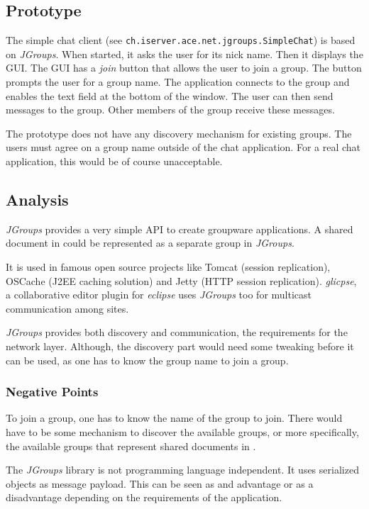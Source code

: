 \subsection{Prototype}
The simple chat client (see \texttt{ch.iserver.ace.net.jgroups.SimpleChat}) is based on \emph{JGroups}. When started, it asks the user for its nick name. Then it displays the GUI. The GUI has a \emph{join} button that allows the user to join a group. The button prompts the user for a group name. The application connects to the group and enables the text field at the bottom of the window. The user can then send messages to the group. Other members of the group receive these messages.

The prototype does not have any discovery mechanism for existing groups. The users must agree on a group name outside of the chat application. For a real chat application, this would be of course unacceptable.


\subsection{Analysis}
\emph{JGroups} provides a very simple API to create groupware applications. A shared document in \ace could be represented as a separate group in \emph{JGroups}. 

It is used in famous open source projects like Tomcat (session replication), OSCache (J2EE caching solution) and Jetty (HTTP session replication). \emph{glicpse}, a collaborative editor plugin for \emph{eclipse} uses \emph{JGroups} too for multicast communication among sites.

\emph{JGroups} provides both discovery and communication, the requirements for the network layer. Although, the discovery part would need some tweaking before it can be used, as one has to know the group name to join a group.

\subsubsection{Negative Points}
To join a group, one has to know the name of the group to join. There would have to be some mechanism to discover the available groups, or more specifically, the available groups that represent shared documents in \ace. 

The \emph{JGroups} library is not programming language independent. It uses serialized objects as message payload. This can be seen as and advantage or as a disadvantage depending on the requirements of the application.

